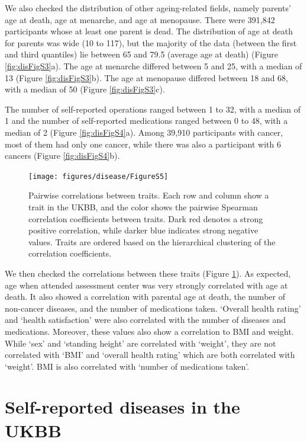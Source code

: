 \documentclass[12pt,twoside]{unicam}
\begin{document}
We also checked the distribution of other ageing-related fields, namely parents' age at death, age at menarche, and age at menopause. There were 391,842 participants whose at least one parent is dead. The distribution of age at death for parents was wide (10 to 117), but the majority of the data (between the first and third quantiles) lie between 65 and 79.5 (average age at death) (Figure \ref{fig:disFigS3}a). The age at menarche differed between 5 and 25, with a median of 13 (Figure \ref{fig:disFigS3}b). The age at menopause differed between 18 and 68, with a median of 50 (Figure \ref{fig:disFigS3}c).

The number of self-reported operations ranged between 1 to 32, with a median of 1 and the number of self-reported medications ranged between 0 to 48, with a median of 2 (Figure \ref{fig:disFigS4}a). Among 39,910 participants with cancer, most of them had only one cancer, while there was also a participant with 6 cancers (Figure \ref{fig:disFigS4}b).

\begin{figure}

{\centering \texttt{[image: figures/disease/FigureS5]} 

}

\caption[Pairwise correlations between traits.]{Pairwise correlations between traits. Each row and column show a trait in the UKBB, and the color shows the pairwise Spearman correlation coefficients between traits. Dark red denotes a strong positive correlation, while darker blue indicates strong negative values. Traits are ordered based on the hierarchical clustering of the correlation coefficients.}\label{fig:disFigS5}
\end{figure}

We then checked the correlations between these traits (Figure \ref{fig:disFigS5}). As expected, age when attended assessment center was very strongly correlated with age at death. It also showed a correlation with parental age at death, the number of non-cancer diseases, and the number of medications taken. `Overall health rating' and `health satisfaction' were also correlated with the number of diseases and medications. Moreover, these values also show a correlation to BMI and weight. While `sex' and `standing height' are correlated with `weight', they are not correlated with `BMI' and `overall health rating' which are both correlated with `weight'. BMI is also correlated with `number of medications taken'.

\hypertarget{self-reported-diseases-in-the-ukbb}{%
\section{Self-reported diseases in the UKBB}\label{self-reported-diseases-in-the-ukbb}}
\end{document}
